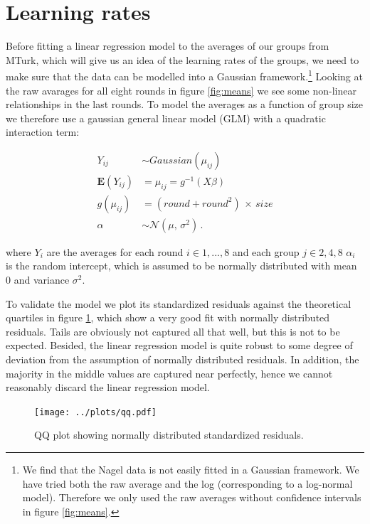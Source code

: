 \section{Learning rates}
Before fitting a linear regression model to the averages of our groups from MTurk, which will give us an idea of the learning rates of the groups, we need to make sure that the data can be modelled into a Gaussian framework.\footnote{We find that the Nagel data \cite{Nagel95} is not easily fitted in a Gaussian framework. We have tried both the raw average and the log (corresponding to a log-normal model). Therefore we only used the raw averages without confidence intervals in figure \ref{fig:means}.} Looking at the raw avarages for all eight rounds in figure \ref{fig:means} we see some non-linear relationships in the last rounds. To model the averages as a function of group size we therefore use a gaussian general linear model (GLM) \cite{Rcoreteam} with a quadratic interaction term:

\begin{align*}
Y_{ij} &\sim Gaussian(\mu_{ij}) \\
\mathbf{E}(Y_{ij}) &= \mu_{ij}  = g^{-1}(X\beta) \\
g(\mu_{ij}) &= (round + round^2) \, \times \, size \\
\alpha &\sim \mathcal{N}(\mu,\,\sigma^{2})\,.
\end{align*}

where $Y_i$ are the averages for each round $i \in {1,..., 8}$  and each group $j \in {2,4,8}$
$\alpha_i$ is the random intercept, which is assumed to be normally distributed with mean $0$ and variance $\sigma^2$. 


To validate the model we plot its standardized residuals against the theoretical quartiles in figure \ref{fig:qq}, which show a very good fit with normally distributed residuals. Tails are obviously not captured all that well, but this is not to be expected. Besided, the linear regression model is quite robust to some degree of deviation from the assumption of normally distributed residuals. In addition, the majority in the middle values are captured near perfectly, hence we cannot reasonably discard the linear regression model.

\begin{figure}
\texttt{[image: ../plots/qq.pdf]}\caption{QQ plot showing normally distributed standardized residuals.}
\label{fig:qq}
\end{figure}


